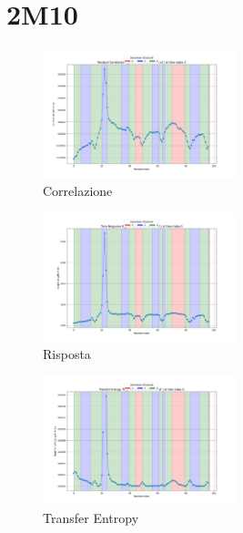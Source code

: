 \documentclass{article}
\begin{document}
\section{2M10}
\begin{figure}[h]
    \centering                            
                                           
    
    \includegraphics[width=0.5\textwidth]{images/2m10Residual Correlation C_ij for i=22 as a function of j at time index 0.png}
    \caption{Correlazione}
\end{figure}
\begin{figure}[h]
    \centering
    \includegraphics[width=0.5\textwidth]{images/2m10Time Response R_ij for i=22 as a function of j at time index 0.png}
    \caption{Risposta}
\end{figure}

\begin{figure}[h]
    \centering
    \includegraphics[width=0.5\textwidth]{images/2m10Transfer Entropy TE_ij for i=22 as a function of j at time index 0.png}
    \caption{Transfer Entropy}
\end{figure}
\end{document}
